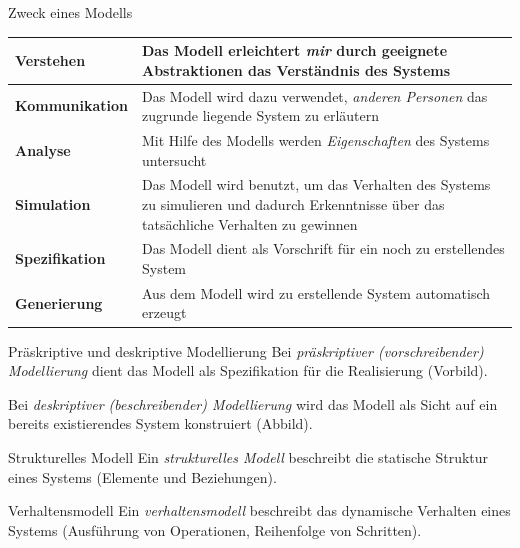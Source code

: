 \begin{bonus}{Zweck eines Modells}
    \begin{tabularx}{\textwidth}{|l|X|}
        \hline
        \bfseries Verstehen     & Das Modell erleichtert \emph{mir} durch geeignete Abstraktionen das Verständnis des Systems                                              \\
        \hline
        \bfseries Kommunikation & Das Modell wird dazu verwendet, \emph{anderen Personen} das zugrunde liegende System zu erläutern                                        \\
        \hline
        \bfseries Analyse       & Mit Hilfe des Modells werden \emph{Eigenschaften} des Systems untersucht                                                                 \\
        \hline
        \bfseries Simulation    & Das Modell wird benutzt, um das Verhalten des Systems zu simulieren und dadurch Erkenntnisse über das tatsächliche Verhalten zu gewinnen \\
        \hline
        \bfseries Spezifikation & Das Modell dient als Vorschrift für ein noch zu erstellendes System                                                                      \\
        \hline
        \bfseries Generierung   & Aus dem Modell wird zu erstellende System automatisch erzeugt                                                                            \\
        \hline
    \end{tabularx}
\end{bonus}

\begin{defi}{Präskriptive und deskriptive Modellierung}
    Bei \emph{präskriptiver (vorschreibender) Modellierung} dient das Modell als Spezifikation für die Realisierung (Vorbild).

    Bei \emph{deskriptiver (beschreibender) Modellierung} wird das Modell als Sicht auf ein bereits existierendes System konstruiert (Abbild).
\end{defi}

\begin{defi}{Strukturelles Modell}
    Ein \emph{strukturelles Modell} beschreibt die statische Struktur eines Systems (Elemente und Beziehungen).
\end{defi}

\begin{defi}{Verhaltensmodell}
    Ein \emph{verhaltensmodell} beschreibt das dynamische Verhalten eines Systems (Ausführung von Operationen, Reihenfolge von Schritten).
\end{defi}

